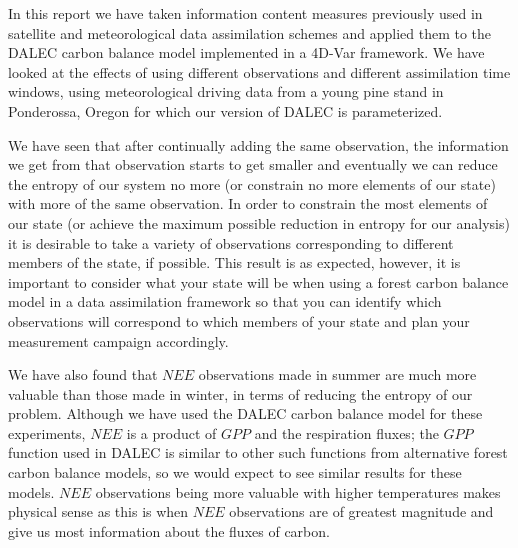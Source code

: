 \documentclass[11pt]{article}
\begin{document}
In this report we have taken information content measures previously used in satellite and meteorological data assimilation schemes \cite{stewart2008correlated, fisher2003estimation, sandu2012practical} and applied them to the DALEC carbon balance model \cite{williams2005improved} implemented in a 4D-Var framework. We have looked at the effects of using different observations and different assimilation time windows, using meteorological driving data from a young pine stand in Ponderossa, Oregon for which our version of DALEC is parameterized. 

We have seen that after continually adding the same observation, the information we get from that observation starts to get smaller and eventually we can reduce the entropy of our system no more (or constrain no more elements of our state) with more of the same observation. In order to constrain the most elements of our state (or achieve the maximum possible reduction in entropy for our analysis) it is desirable to take a variety of observations corresponding to different members of the state, if possible. This result is as expected, however, it is important to consider what your state will be when using a forest carbon balance model in a data assimilation framework so that you can identify which observations will correspond to which members of your state and plan your measurement campaign accordingly.

We have also found that $NEE$ observations made in summer are much more valuable than those made in winter, in terms of reducing the entropy of our problem. Although we have used the DALEC carbon balance model for these experiments, $NEE$ is a product of $GPP$ and the respiration fluxes; the $GPP$ function used in DALEC is similar to other such functions from alternative forest carbon balance models, so we would expect to see similar results for these models. $NEE$ observations being more valuable with higher temperatures makes physical sense as this is when $NEE$ observations are of greatest magnitude and give us most information about the fluxes of carbon.    

{}

\end{document}
